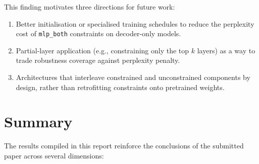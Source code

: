 \documentclass{article}
\begin{document}
This finding motivates three directions for future work:
\begin{enumerate}
    \item Better initialisation or specialised training schedules to reduce the perplexity cost of \texttt{mlp\_both} constraints on decoder-only models.
    \item Partial-layer application (e.g., constraining only the top $k$ layers) as a way to trade robustness coverage against perplexity penalty.
    \item Architectures that interleave constrained and unconstrained components by design, rather than retrofitting constraints onto pretrained weights.
\end{enumerate}


\section{Summary}
\label{sec:summary}

The results compiled in this report reinforce the conclusions of the submitted paper across several dimensions:
\end{document}
